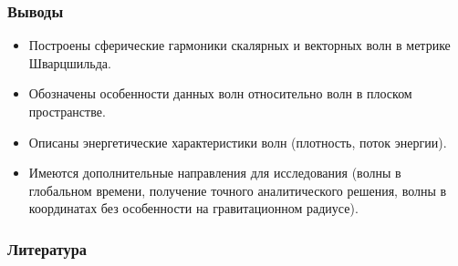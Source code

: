 \documentclass[compress, 9pt]{beamer}
\def\docroot{../..}
\begin{document}
    \begin{frame}\frametitle{Выводы}

        \begin{itemize}\justifying
            \item Построены сферические гармоники скалярных и векторных волн в метрике Шварцшильда.
            \item Обозначены особенности данных волн относительно волн в плоском пространстве.
            \item Описаны энергетические характеристики волн (плотность, поток энергии).
            \item Имеются дополнительные направления для исследования (волны в глобальном времени\nocite{burlankov_space_dynamics}, получение точного аналитического решения, волны в координатах без особенности на гравитационном радиусе).
        \end{itemize}

    \end{frame}

    \begin{frame}\frametitle{Литература}

        {\tiny{
        
        
        }}

    \end{frame}
\end{document}
